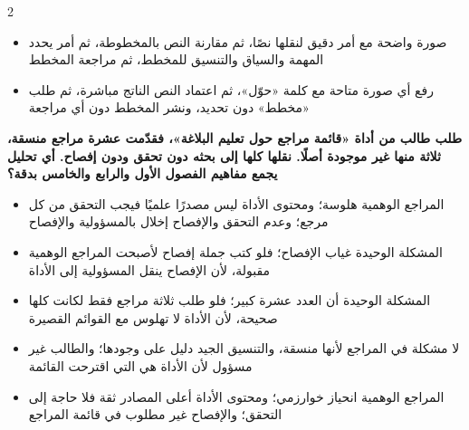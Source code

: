 \documentclass[10pt,a4paper]{article}
\begin{document}
\begin{multicols}{2}
\begin{minipage}{\linewidth}
\begin{itemize}[leftmargin=0.95cm, labelsep=4pt, itemsep=1pt, topsep=3pt, parsep=0pt]
  \item[\textbf{د)}] صورة واضحة مع أمر دقيق لنقلها نصًا، ثم مقارنة النص بالمخطوطة، ثم أمر يحدد المهمة والسياق والتنسيق للمخطط، ثم مراجعة المخطط
  \item[\textbf{هـ)}] رفع أي صورة متاحة مع كلمة «حوّل»، ثم اعتماد النص الناتج مباشرة، ثم طلب «مخطط» دون تحديد، ونشر المخطط دون أي مراجعة
\end{itemize}
\end{minipage}\par\vspace{8pt plus 6pt}
\noindent\begin{minipage}{\linewidth}
\hangindent=0.7cm\textbf{طلب طالب من أداة «قائمة مراجع حول تعليم البلاغة»، فقدّمت عشرة مراجع منسقة، ثلاثة منها غير موجودة أصلًا. نقلها كلها إلى بحثه دون تحقق ودون إفصاح. أي تحليل يجمع مفاهيم الفصول الأول والرابع والخامس بدقة؟}
\begin{itemize}[leftmargin=0.95cm, labelsep=4pt, itemsep=1pt, topsep=3pt, parsep=0pt]
  \item[\textbf{أ)}] المراجع الوهمية هلوسة؛ ومحتوى الأداة ليس مصدرًا علميًا فيجب التحقق من كل مرجع؛ وعدم التحقق والإفصاح إخلال بالمسؤولية والإفصاح
  \item[\textbf{ب)}] المشكلة الوحيدة غياب الإفصاح؛ فلو كتب جملة إفصاح لأصبحت المراجع الوهمية مقبولة، لأن الإفصاح ينقل المسؤولية إلى الأداة
  \item[\textbf{ج)}] المشكلة الوحيدة أن العدد عشرة كبير؛ فلو طلب ثلاثة مراجع فقط لكانت كلها صحيحة، لأن الأداة لا تهلوس مع القوائم القصيرة
  \item[\textbf{د)}] لا مشكلة في المراجع لأنها منسقة، والتنسيق الجيد دليل على وجودها؛ والطالب غير مسؤول لأن الأداة هي التي اقترحت القائمة
  \item[\textbf{هـ)}] المراجع الوهمية انحياز خوارزمي؛ ومحتوى الأداة أعلى المصادر ثقة فلا حاجة إلى التحقق؛ والإفصاح غير مطلوب في قائمة المراجع
\end{itemize}
\end{minipage}\par\vspace{8pt plus 6pt}
\end{multicols}
\vfill
\end{document}
